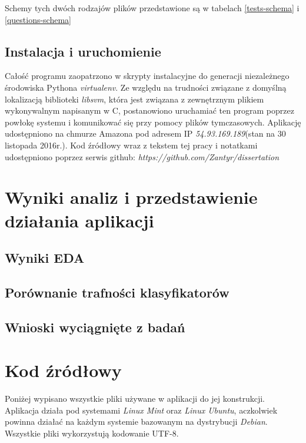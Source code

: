 \documentclass[12pt,a4paper,oneside]{report} %
\begin{document}
Schemy tych dwóch rodzajów plików przedstawione są w tabelach \ref{tests-schema} i \ref{questions-schema}

\section{Instalacja i uruchomienie}

Całość programu zaopatrzono w skrypty instalacyjne do generacji niezależnego środowiska Pythona \emph{virtualenv}. Ze względu na trudności związane z domyślną lokalizacją biblioteki \emph{libsvm}, która jest związana z zewnętrznym plikiem wykonywalnym napisanym w C, postanowiono uruchamiać ten program poprzez powłokę systemu i komunikować się przy pomocy plików tymczasowych. Aplikację udostępniono na chmurze Amazona pod adresem IP \emph{54.93.169.189}(stan na 30 listopada 2016r.). Kod źródłowy wraz z tekstem tej pracy i notatkami udostępniono poprzez serwis github: \emph{https://github.com/Zantyr/dissertation}\par










\chapter{Wyniki analiz i przedstawienie działania aplikacji}
\section{Wyniki EDA}
\section{Porównanie trafności klasyfikatorów}
\section{Wnioski wyciągnięte z badań}











\chapter{Kod źródłowy}
Poniżej wypisano wszystkie pliki używane w aplikacji do jej konstrukcji. Aplikacja działa pod systemami \emph{Linux Mint} oraz \emph{Linux Ubuntu}, aczkolwiek powinna działać na każdym systemie bazowanym na dystrybucji \emph{Debian}. Wszystkie pliki wykorzystują kodowanie UTF-8.
\end{document}
